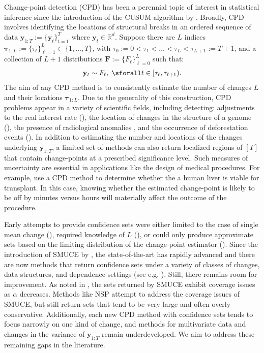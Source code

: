 Change-point detection (CPD) has been a perennial topic of interest in statistical inference since the introduction of the CUSUM algorithm by \cite{Page54}. Broadly, CPD involves identifying the locations of structural breaks in an ordered sequence of data $\mathbf{y}_{1:T}:= \{\mathbf{y}_t\}_{t=1}^T$ where $\mathbf{y}_t \in \mathbb{R}^d$. Suppose there are $L$ indices $\boldsymbol{\tau}_{1:L}:=\{\tau_\ell\}_{\ell=1}^{L} \subset \{1,\ldots,T\}$, with $\tau_0:=0 < \tau_1 < \ldots< \tau_L < \tau_{L+1} := T+1$, and a collection of $L+1$ distributions $\mathbf{F} := \{F_\ell\}_{\ell=0}^L$ such that:
\begin{align}\label{eq:cdp-def}
    \mathbf{y}_t \sim F_\ell, \;\sforall t \in [\tau_\ell,\tau_{\ell+1}).
\end{align}
The aim of any CPD method is to consistently estimate the number of changes $L$ and their locations $\boldsymbol{\tau}_{1:L}$. Due to the generality of this construction, CPD problems appear in a variety of scientific fields, including detecting: adjustments to the real interest rate (\citealp{Bai03}), the location of changes in the structure of a genome (\citealp{Muggeo11}), the presence of radiological anomalies \citep{madrid2019sequential}, and the occurrence of deforestation events (\citealp{Wendelberger21}). In addition to estimating the number and locations of the changes underlying $\mathbf{y}_{1:T}$, a limited set of methods can also return localized regions of $[T]$ that contain change-points at a prescribed significance level. Such measures of uncertainty are essential in applications like the design of medical procedures. For example, \cite{Gao19} use a CPD method to determine whether the a human liver is viable for transplant. In this case, knowing whether the estimated change-point is likely to be off by minutes versus hours will materially affect the outcome of the procedure. 

Early attempts to provide confidence sets were either limited to the case of single mean change (\citealp{Siegmund86, Worsley86}), required knowledge of $L$ (\citealp{Bai03}), or could only produce approximate sets based on the limiting distribution of the change-point estimator (\citealp{Bai10}). Since the introduction of SMUCE by \cite{Frick14}, the state-of-the-art has rapidly advanced and there are now methods that return confidence sets under a variety of classes of changes, data structures, and dependence settings (see e.g. \citealp{Pein17, Eichinger18, Fang20, Chen22, Cho22, Fryzlewicz23, Fryzlewicz24}). Still, there remains room for improvement. As noted in \cite{chen2014discussion}, the sets returned by SMUCE exhibit coverage issues as $\alpha$ decreases. Methods like NSP attempt to address the coverage issues of SMUCE, but still return sets that tend to be very large and often overly conservative. Additionally, each new CPD method with confidence sets tends to focus narrowly on one kind of change, and methods for multivariate data and changes in the variance of $\mathbf{y}_{1:T}$ remain underdeveloped. We aim to address these remaining gaps in the literature.


